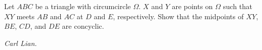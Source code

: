 Let $ABC$ be a triangle with circumcircle $\Omega$. $X$ and $Y$ are points on $\Omega$ such that $XY$ meets $AB$ and $AC$ at $D$ and $E$, respectively. Show that the midpoints of $XY$, $BE$, $CD$, and $DE$ are concyclic.

\textit{Carl Lian.}